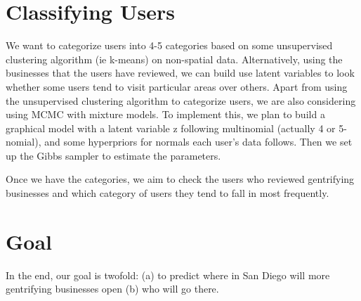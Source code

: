 \documentclass[11pt,a4paper]{article}
\begin{document}
	
	\section{Classifying Users}
	We want to categorize users into 4-5 categories based on some unsupervised clustering algorithm (ie k-means) on non-spatial data. Alternatively, using the businesses that the users have reviewed, we can build use latent variables to look whether some users tend to visit particular areas over others. 
	Apart from using the unsupervised clustering algorithm to categorize users, we are also considering using MCMC with mixture models. To implement this, we plan to build a graphical model with a latent variable z following multinomial (actually 4 or 5-nomial), and some hyperpriors for normals each user's data follows. Then we set up the Gibbs sampler to estimate the parameters. 
	
	Once we have the categories, we aim to check the users who reviewed gentrifying businesses and which category of users they tend to fall in most frequently. 
	
	\section{Goal}
	In the end, our goal is twofold: (a) to predict where in San Diego will more gentrifying businesses open (b) who will go there.
	
\end{document}
